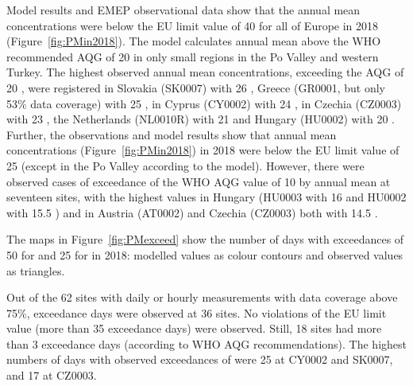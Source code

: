 Model results and EMEP observational data show that the annual mean \PM[10] concentrations were below the EU limit value of 40 \ug for all of Europe in 2018 (Figure~\ref{fig:PMin2018}). The model calculates annual mean \PM[10] above the WHO recommended AQG of 20 \ug
in only small regions in the Po Valley and western Turkey. The highest
observed annual mean \PM[10] concentrations, exceeding the AQG of 20 \ug, were registered in Slovakia (SK0007) with 26 \ug, Greece (GR0001, but only 53\% data coverage) with 25 \ug, in Cyprus (CY0002) with 24 \ug, in Czechia (CZ0003) with 23 \ug, the Netherlands (NL0010R) with 21 \ug and Hungary (HU0002) with 20 \ug. Further, the observations and model results show that annual mean \PM[2.5] concentrations (Figure~\ref{fig:PMin2018}) in 2018 were below the EU limit value of 25 \ug (except in the Po Valley according to the model). However, there were observed cases of exceedance of the WHO AQG value of 10 \ug by annual mean \PM[2.5] at seventeen sites, with the highest values in Hungary (HU0003 with 16 \ug and HU0002 with
15.5 \ug) and in Austria (AT0002) and Czechia (CZ0003) both with 14.5 \ug.




The maps in Figure~\ref{fig:PMexceed} show the number of days with
exceedances of 50 \ug for \PM[10] and 25 \ug for \PM[2.5] in 2018:
modelled values as colour contours and observed values as triangles.

Out of the 62 sites with daily or hourly \PM[10] measurements with data
coverage above 75\%, exceedance days were observed at 36 sites. No
violations of the \PM[10] EU limit value (more than 35 exceedance
days) were observed. Still, 18 sites had more than 3 exceedance days
(according to WHO AQG recommendations). The highest numbers of days
with observed exceedances of \PM[10] were 25 at CY0002 and SK0007, and 17
at CZ0003.

